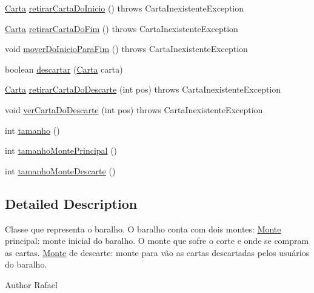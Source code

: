 \begin{DoxyCompactItemize}
\hyperlink{class_baralho_1_1_carta}{Carta} \hyperlink{class_baralho_1_1_baralho_a88c1b1eec22e717be39227ed2ceb9490}{retirarCartaDoInicio} ()  throws CartaInexistenteException
\item 
\hyperlink{class_baralho_1_1_carta}{Carta} \hyperlink{class_baralho_1_1_baralho_a8441347c4eb47a0ba0f3bfbdfca59a9c}{retirarCartaDoFim} ()  throws CartaInexistenteException 
\item 
void \hyperlink{class_baralho_1_1_baralho_a9df1c0a9c5c6c227b36e434248d5698d}{moverDoInicioParaFim} ()  throws CartaInexistenteException 
\item 
boolean \hyperlink{class_baralho_1_1_baralho_ad95b8caaaf2602be21923a9c02ab741f}{descartar} (\hyperlink{class_baralho_1_1_carta}{Carta} carta)
\item 
\hyperlink{class_baralho_1_1_carta}{Carta} \hyperlink{class_baralho_1_1_baralho_ad6ceed72b137e5bf5490af7dcd282648}{retirarCartaDoDescarte} (int pos)  throws CartaInexistenteException 
\item 
void \hyperlink{class_baralho_1_1_baralho_a9a20256555c03889f244ce40957ae7f8}{verCartaDoDescarte} (int pos)  throws CartaInexistenteException 
\item 
int \hyperlink{class_baralho_1_1_baralho_ac382a9e91f65da63c8e3fac26eba6225}{tamanho} ()
\item 
int \hyperlink{class_baralho_1_1_baralho_aace43f8f3dbbca74e2e2b5083ec3f305}{tamanhoMontePrincipal} ()
\item 
int \hyperlink{class_baralho_1_1_baralho_a2c293b134d1b685b19e46376097c02b8}{tamanhoMonteDescarte} ()
\end{DoxyCompactItemize}


\subsection{Detailed Description}
Classe que representa o baralho. O baralho conta com dois montes: \hyperlink{class_baralho_1_1_monte}{Monte} principal: monte inicial do baralho. O monte que sofre o corte e onde se compram as cartas. \hyperlink{class_baralho_1_1_monte}{Monte} de descarte: monte para vão as cartas descartadas pelos usuários do baralho. \begin{DoxyAuthor}{Author}
Rafael 
\end{DoxyAuthor}


